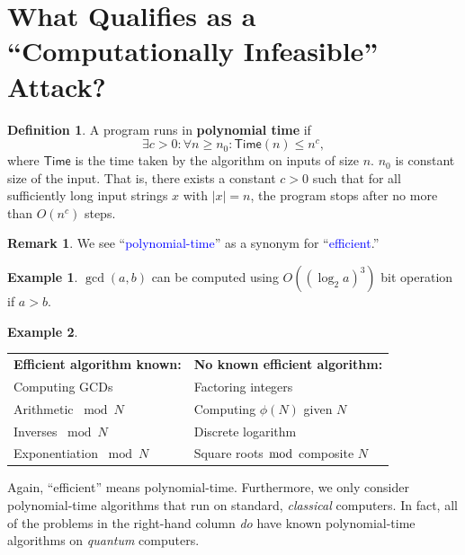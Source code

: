 \documentclass[12pt,openany]{book}
\theoremstyle{definition}
\newtheorem{definition}{Definition}[chapter]
\newtheorem{remark}{Remark}[chapter]
\newtheorem{example}{Example}[chapter]
\renewcommand{\abs}[1]{\left\lvert #1 \right\rvert}
\begin{document}
	\section{What Qualifies as a ``Computationally Infeasible'' Attack?}
	\begin{tcolorbox}[colframe=defcolor,title={\color{white}\bf Polynomial Time}]
		\begin{definition}
			A program runs in \textbf{polynomial time} if \[
			\exists c>0:\forall n\geq n_0:\mathsf{Time}(n)\leq n^c,
			\] where \(\mathsf{Time}\) is the time taken by the algorithm on inputs of size \(n\). \(n_0\) is constant size of  the input. That is, there exists a constant $c > 0$ such that for all sufficiently long input strings $x$ with $\abs{x}=n$, the program stops after no more than $O(n^c)$ steps.
		\end{definition}
	\end{tcolorbox}
	\begin{remark}
		We see ``\textcolor{blue}{polynomial-time}'' as a synonym for ``\textcolor{blue}{efficient}.''
	\end{remark}
	\vspace{10pt}
	\begin{example}
		\(\gcd(a,b)\) can be computed using \(O((\log_2a)^3)\) bit operation if \(a>b\).
	\end{example}
	\vspace{10pt}
	\begin{example}
		\ \begin{table}[h!]\centering
			\begin{tabular}{l|l}
				\textbf{Efficient algorithm known:} & \textbf{No known efficient algorithm:}\\
				Computing GCDs & Factoring integers\\
				Arithmetic \(\bmod N\) & Computing \(\phi(N)\) given \(N\) \\
				Inverses \(\bmod N\) & Discrete logarithm \\
				Exponentiation \(\bmod N\) & Square roots \(\bmod\) composite \(N\) \\
			\end{tabular}
		\end{table}
	
		Again, ``efficient'' means polynomial-time. Furthermore, we only consider polynomial-time algorithms that run on standard, \textit{classical} computers. In fact, all of the problems in the right-hand column \textit{do} have known polynomial-time algorithms on \textit{quantum} computers.
	\end{example}
	\newpage
\end{document}
